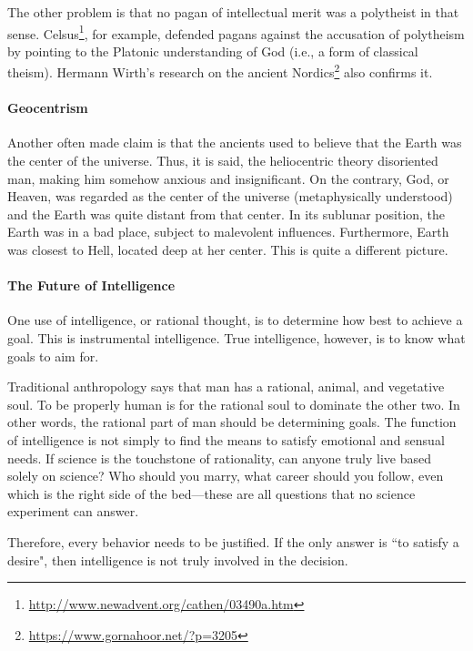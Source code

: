 The other problem is that no pagan of intellectual merit was a polytheist in that sense. Celsus\footnote{\url{http://www.newadvent.org/cathen/03490a.htm}}, for example, defended pagans against the accusation of polytheism by pointing to the Platonic understanding of God (i.e., a form of classical theism). Hermann Wirth's research on the ancient Nordics\footnote{\url{https://www.gornahoor.net/?p=3205}} also confirms it.

\paragraph{Geocentrism}
Another often made claim is that the ancients used to believe that the Earth was the center of the universe. Thus, it is said, the heliocentric theory disoriented man, making him somehow anxious and insignificant. On the contrary, God, or Heaven, was regarded as the center of the universe (metaphysically understood) and the Earth was quite distant from that center. In its sublunar position, the Earth was in a bad place, subject to malevolent influences. Furthermore, Earth was closest to Hell, located deep at her center. This is quite a different picture.

\paragraph{The Future of Intelligence}
One use of intelligence, or rational thought, is to determine how best to achieve a goal. This is instrumental intelligence. True intelligence, however, is to know what goals to aim for.

Traditional anthropology says that man has a rational, animal, and vegetative soul. To be properly human is for the rational soul to dominate the other two. In other words, the rational part of man should be determining goals. The function of intelligence is not simply to find the means to satisfy emotional and sensual needs. If science is the touchstone of rationality, can anyone truly live based solely on science? Who should you marry, what career should you follow, even which is the right side of the bed—these are all questions that no science experiment can answer.

Therefore, every behavior needs to be justified. If the only answer is ``to satisfy a desire", then intelligence is not truly involved in the decision.

